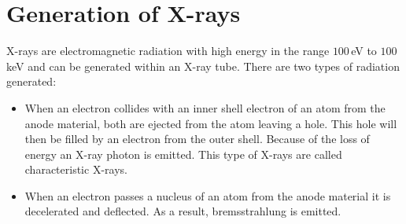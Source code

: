 \section{Generation of X-rays}
X-rays are electromagnetic radiation with high energy in the range $100\,$eV to $100\,$keV and can be generated within an X-ray tube.
There are two types of radiation generated:
\begin{itemize}
    \item When an electron collides with an inner shell electron of an atom from the anode material, both are ejected from the atom leaving a hole. This hole will then be filled by an electron from the outer shell. Because of the loss of energy an X-ray photon is emitted. This type of X-rays are called characteristic X-rays.
    \item When an electron passes a nucleus of an atom from the anode material it is decelerated and deflected. As a result, bremsstrahlung is emitted.
\end{itemize}

